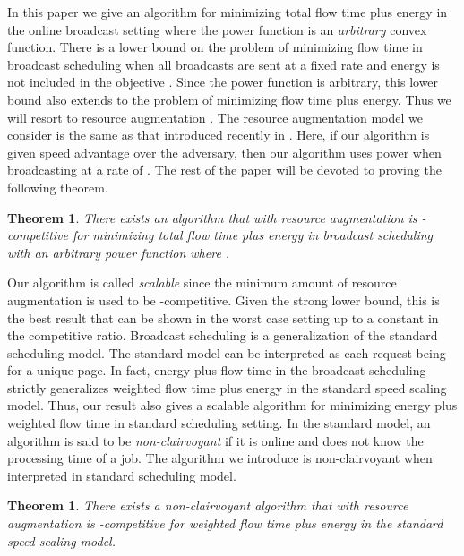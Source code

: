 \documentclass[11pt]{article}
\newtheorem{theorem}[lemma]{Theorem}
\begin{document}
  In this paper we give an algorithm for minimizing total flow time plus energy in the online broadcast setting where the power function is an \emph{arbitrary} convex function.  There is a  lower bound on the problem of minimizing  flow time in broadcast scheduling when all broadcasts are sent at a fixed rate and energy is not included in the objective \cite{KalyanasundaramPV00}. Since the power function is arbitrary, this lower bound also extends to the problem of minimizing flow time plus energy.  Thus we will resort to resource augmentation \cite{KalyanasundaramP95}.  The resource augmentation model we consider is the same as that introduced recently in \cite{GuptaKP10}.  Here, if our algorithm is given  speed advantage over the adversary, then our algorithm uses power  when broadcasting at a rate of .  The rest of the paper will be devoted to proving the following theorem.

\begin{theorem}
\label{thm:main}
There exists an algorithm that with  resource augmentation is -competitive for minimizing total flow time plus energy in broadcast scheduling with an arbitrary power function where . 
\end{theorem}

Our algorithm is called \emph{scalable} since the minimum amount of resource augmentation is used to be -competitive. Given the strong lower bound, this is the best result that can be shown in the worst case setting up to a constant in the competitive ratio. Broadcast scheduling is a generalization of the standard scheduling model.  The standard model can be interpreted as each request being for a unique page.  In fact, energy plus flow time in the broadcast scheduling strictly generalizes weighted flow time plus energy in the standard speed scaling model.  Thus, our result also gives a scalable algorithm for minimizing energy plus weighted flow time  in standard scheduling setting.  In the standard model, an algorithm is said to be \emph{non-clairvoyant} if it is online and does not know the processing time of a job.    The algorithm we introduce is non-clairvoyant when interpreted in standard scheduling model.

\begin{theorem}\label{thm:non}
There exists a non-clairvoyant algorithm that with  resource augmentation is -competitive  for weighted flow time plus energy in the standard speed scaling model.
\end{theorem}
\end{document}
